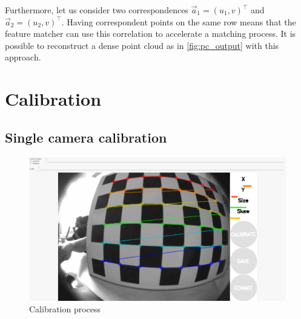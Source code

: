 Furthermore, let us consider two correspondences $\vec{a}_1 = (u_1, v)^\top$ and $\vec{a}_2 = (u_2, v)^\top $. 
Having correspondent points on the same row means that the feature matcher can use this correlation to accelerate a matching process.
It is possible to reconstruct a dense point cloud as in \autoref{fig:pc_output} with this approach.

\section{Calibration}
\label{sec:prelimin_calibration}
\subsection{Single camera calibration}

\begin{figure}[h]
    \centering
    \includegraphics[width=.6\textwidth]{graphics/calibration.png}
    \caption{Calibration process}
    \label{fig:calib}
\end{figure}

